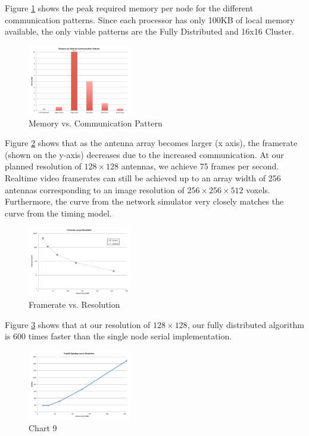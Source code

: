 \documentclass[twocolumn]{article}
\begin{document}
Figure \ref{mem vs comm pattern} shows the peak required memory per node for the different communication patterns. Since each processor has only 100KB of local memory available, the only viable patterns are the Fully Distributed and 16x16 Cluster.

\begin{figure}[!h]
\centering
\includegraphics*[width=0.4\textwidth]{figures/chart6.pdf}
\caption{Memory vs. Communication Pattern}
\label{mem vs comm pattern}
\end{figure}

Figure \ref{framerate vs resolution} shows that as the antenna array becomes larger (x axis), the framerate (shown on the y-axis) decreases due to the increased communication. At our planned resolution of $128\times128$ antennas, we achieve 75 frames per second. Realtime video framerates can still be achieved up to an array width of 256 antennas corresponding to an image resolution of $256\times256\times512$ voxels. Furthermore, the curve from the network simulator very closely matches the curve from the timing model.

\begin{figure}[!h]
\centering
\includegraphics*[width=0.4\textwidth]{figures/chart7.pdf}
\caption{Framerate vs. Resolution}
\label{framerate vs resolution}
\end{figure}

Figure \ref{speedup vs resolution} shows that at our resolution of $128\times128$, our fully distributed algorithm is 600 times faster than the single node serial implementation.

\begin{figure}[!h]
\centering
\includegraphics*[width=0.4\textwidth]{figures/chart9.pdf}
\caption{Chart 9}
\label{speedup vs resolution}
\end{figure}
\end{document}
